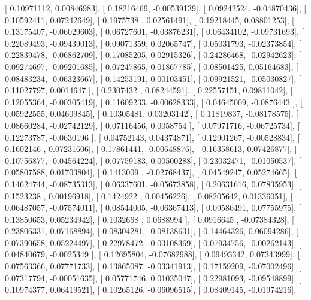 \documentclass{article}
\begin{document}
       [ 0.10971112,  0.00846983],
       [ 0.18216469, -0.00539139],
       [ 0.09242524, -0.04870436],
       [ 0.10592411,  0.07242649],
       [ 0.1975738 ,  0.02561491],
       [ 0.19218445,  0.08801253],
       [ 0.13175407, -0.06029603],
       [ 0.06727601, -0.03876231],
       [ 0.06434102, -0.09731693],
       [ 0.22089493, -0.09439013],
       [ 0.09071359,  0.02065747],
       [ 0.05031793, -0.02373854],
       [ 0.22839478, -0.06862709],
       [ 0.17085205,  0.02915326],
       [ 0.24286468, -0.02942623],
       [ 0.09274697, -0.09201685],
       [ 0.07247865,  0.01867785],
       [ 0.08501425,  0.05164683],
       [ 0.08483234, -0.06323667],
       [ 0.14253191,  0.00103451],
       [ 0.09921521, -0.05030827],
       [ 0.11027797,  0.0014647 ],
       [ 0.2307432 ,  0.08244591],
       [ 0.22557151,  0.09811042],
       [ 0.12055364, -0.00305419],
       [ 0.11609233, -0.00628333],
       [ 0.04645009, -0.0876443 ],
       [ 0.05922555,  0.04609845],
       [ 0.10305481,  0.03203142],
       [ 0.11819837, -0.08178575],
       [ 0.08660284, -0.02742129],
       [ 0.07116456,  0.0058754 ],
       [ 0.07971716, -0.06725734],
       [ 0.12273787, -0.0630196 ],
       [ 0.04752143,  0.04374871],
       [ 0.12901267, -0.00528834],
       [ 0.1602146 ,  0.07231606],
       [ 0.17861441, -0.00648876],
       [ 0.16358613,  0.07426877],
       [ 0.10756877, -0.04564224],
       [ 0.07759183,  0.00500288],
       [ 0.23032471, -0.01050537],
       [ 0.05807588,  0.01703804],
       [ 0.1413009 , -0.02768437],
       [ 0.04549247,  0.05274665],
       [ 0.14624744, -0.08735313],
       [ 0.06337601, -0.05673858],
       [ 0.20631616,  0.07835953],
       [ 0.1523238 ,  0.00196918],
       [ 0.1424922 ,  0.00456226],
       [ 0.08205642,  0.01336051],
       [ 0.06487057, -0.07574011],
       [ 0.08544005, -0.06367413],
       [ 0.09586491,  0.07755975],
       [ 0.13850653,  0.05234942],
       [ 0.1032668 ,  0.0688994 ],
       [ 0.0916645 , -0.07384328],
       [ 0.23806331,  0.07168894],
       [ 0.08304281, -0.08138631],
       [ 0.14464326,  0.06094286],
       [ 0.07390658,  0.05224497],
       [ 0.22978472, -0.03108369],
       [ 0.07934756, -0.00262143],
       [ 0.04840679, -0.0025349 ],
       [ 0.12695804, -0.07682988],
       [ 0.09493342,  0.07343999],
       [ 0.07563366,  0.07771733],
       [ 0.13865087, -0.03341913],
       [ 0.17159209, -0.07002496],
       [ 0.07317794, -0.00051635],
       [ 0.05771746,  0.01035047],
       [ 0.22981093, -0.09548899],
       [ 0.10974377,  0.06419521],
       [ 0.10265126, -0.06096515],
       [ 0.08409145, -0.01974216],
\end{document}
